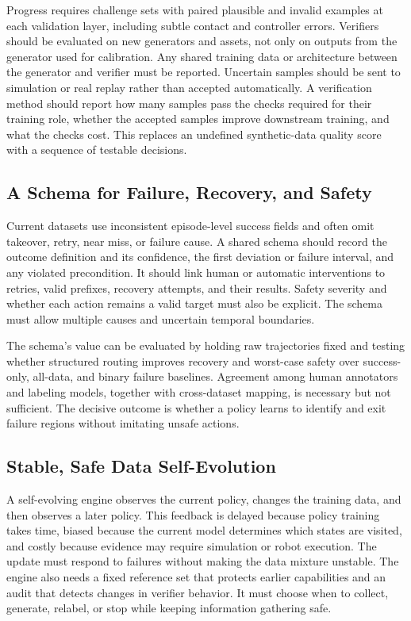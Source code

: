 Progress requires challenge sets with paired plausible and invalid examples at each validation layer, including subtle contact and controller errors.
Verifiers should be evaluated on new generators and assets, not only on outputs from the generator used for calibration.
Any shared training data or architecture between the generator and verifier must be reported.
Uncertain samples should be sent to simulation or real replay rather than accepted automatically.
A verification method should report how many samples pass the checks required for their training role, whether the accepted samples improve downstream training, and what the checks cost.
This replaces an undefined synthetic-data quality score with a sequence of testable decisions.

\subsection{A Schema for Failure, Recovery, and Safety}

Current datasets use inconsistent episode-level success fields and often omit takeover, retry, near miss, or failure cause.
A shared schema should record the outcome definition and its confidence, the first deviation or failure interval, and any violated precondition.
It should link human or automatic interventions to retries, valid prefixes, recovery attempts, and their results.
Safety severity and whether each action remains a valid target must also be explicit.
The schema must allow multiple causes and uncertain temporal boundaries.

The schema's value can be evaluated by holding raw trajectories fixed and testing whether structured routing improves recovery and worst-case safety over success-only, all-data, and binary failure baselines.
Agreement among human annotators and labeling models, together with cross-dataset mapping, is necessary but not sufficient.
The decisive outcome is whether a policy learns to identify and exit failure regions without imitating unsafe actions.

\subsection{Stable, Safe Data Self-Evolution}

A self-evolving engine observes the current policy, changes the training data, and then observes a later policy.
This feedback is delayed because policy training takes time, biased because the current model determines which states are visited, and costly because evidence may require simulation or robot execution.
The update must respond to failures without making the data mixture unstable.
The engine also needs a fixed reference set that protects earlier capabilities and an audit that detects changes in verifier behavior.
It must choose when to collect, generate, relabel, or stop while keeping information gathering safe.

